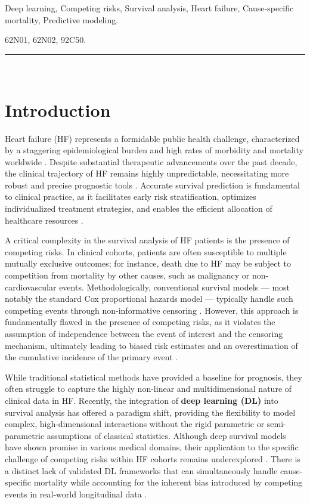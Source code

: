 \documentclass[twoside]{article}
\begin{document}
 Deep learning, Competing risks, Survival analysis, Heart failure, Cause‑specific mortality, Predictive modeling.

 62N01, 62N02, 92C50. \\
\hspace{1cm}\rule{\textwidth}{0.2mm}\\
\section{Introduction}
Heart failure (HF) represents a formidable public health challenge, characterized by a staggering epidemiological burden and high rates of morbidity and mortality worldwide \cite{sarteschi2020}. Despite substantial therapeutic advancements over the past decade, the clinical trajectory of HF remains highly unpredictable, necessitating more robust and precise prognostic tools \cite{virani2021}. Accurate survival prediction is fundamental to clinical practice, as it facilitates early risk stratification, optimizes individualized treatment strategies, and enables the efficient allocation of healthcare resources \cite{huang2020}.

A critical complexity in the survival analysis of HF patients is the presence of competing risks. In clinical cohorts, patients are often susceptible to multiple mutually exclusive outcomes; for instance, death due to HF may be subject to competition from mortality by other causes, such as malignancy or non-cardiovascular events. Methodologically, conventional survival models — most notably the standard Cox proportional hazards model — typically handle such competing events through non-informative censoring \cite{gui2005}. However, this approach is fundamentally flawed in the presence of competing risks, as it violates the assumption of independence between the event of interest and the censoring mechanism, ultimately leading to biased risk estimates and an overestimation of the cumulative incidence of the primary event \cite{esilva2022}.

While traditional statistical methods have provided a baseline for prognosis, they often struggle to capture the highly non-linear and multidimensional nature of clinical data in HF. Recently, the integration of \textbf{deep learning (DL)} into survival analysis \cite{lee2019} has offered a paradigm shift, providing the flexibility to model complex, high-dimensional interactions without the rigid parametric or semi-parametric assumptions of classical statistics. Although deep survival models have shown promise in various medical domains, their application to the specific challenge of competing risks within HF cohorts remains underexplored \cite{blumenstock2022}. There is a distinct lack of validated DL frameworks that can simultaneously handle cause-specific mortality while accounting for the inherent bias introduced by competing events in real-world longitudinal data \cite{bellazzi2022}.
\end{document}
